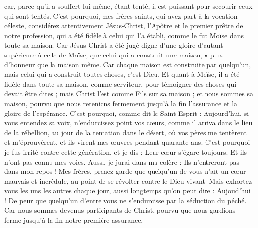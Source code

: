 \begin{multicols}{2}
car, parce qu'il a souffert lui-même, étant tenté, il est puissant pour secourir ceux qui sont tentés.
\VerseOne{}C'est pourquoi, mes frères saints, qui avez part à la vocation céleste, considérez attentivement Jésus-Christ, l'Apôtre et le premier prêtre de notre profession,
qui a été fidèle à celui qui l'a établi, comme le fut Moïse dans toute sa maison.
Car Jésus-Christ a été jugé digne d'une gloire d'autant supérieure à celle de Moïse, que celui qui a construit une maison, a plus d'honneur que la maison même.
Car chaque maison est construite par quelqu'un, mais celui qui a construit toutes choses, c'est Dieu.
Et quant à Moïse, il a été fidèle dans toute sa maison, comme serviteur, pour témoigner des choses qui devait être dites ;
mais Christ l'est comme Fils sur sa maison ; et nous sommes sa maison, pourvu que nous retenions fermement jusqu'à la fin l'assurance et la gloire de l'espérance.
C'est pourquoi, comme dit le Saint-Esprit : Aujourd'hui, si vous entendez sa voix,
n'endurcissez point vos cœurs, comme il arriva dans le lieu de la rébellion, au jour de la tentation dans le désert,
où vos pères me tentèrent et m'éprouvèrent, et ils virent mes œuvres pendant quarante ans.
C'est pourquoi je fus irrité contre cette génération, et je dis : Leur cœur s'égare toujours. Et ils n'ont pas connu mes voies.
Aussi, je jurai dans ma colère : Ils n'entreront pas dans mon repos !
Mes frères, prenez garde que quelqu'un de vous n'ait un cœur mauvais et incrédule, au point de se révolter contre le Dieu vivant.
Mais exhortez-vous les uns les autres chaque jour, aussi longtemps qu'on peut dire : Aujoud'hui ! De peur que quelqu'un d'entre vous ne s'endurcisse par la séduction du péché.
Car nous sommes devenus participants de Christ, pourvu que nous gardions ferme jusqu'à la fin notre première assurance,

\end{multicols}
